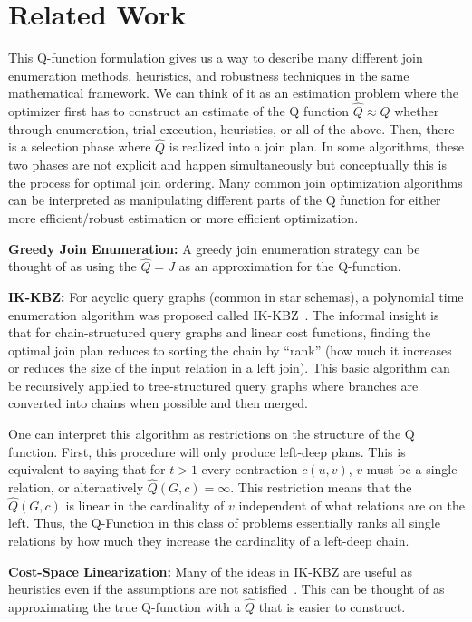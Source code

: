 \section{Related Work}
This Q-function formulation gives us a way to describe many different join enumeration methods, heuristics, and robustness techniques in the same mathematical framework. We can think of it as an estimation problem where the optimizer first has to construct an estimate of the Q function $\hat{Q} \approx Q$ whether through enumeration, trial execution, heuristics, or all of the above. Then, there is a selection phase where $\hat{Q}$ is realized into a join plan. In some algorithms, these two phases are not explicit and happen simultaneously but conceptually this is the process for optimal join ordering. Many common join optimization algorithms can be interpreted as manipulating different parts of the Q function for either more efficient/robust estimation or more efficient optimization.

\vspace{0.25em} \noindent \textbf{Greedy Join Enumeration: } A greedy join enumeration strategy can be thought of as using the $\hat{Q} = J$ as an approximation for the Q-function.

\vspace{0.25em} \noindent \textbf{IK-KBZ: } For acyclic query graphs (common in star schemas), a polynomial time enumeration algorithm was proposed called IK-KBZ~\cite{?}. The informal insight is that for chain-structured query graphs and linear cost functions, finding the optimal join plan reduces to sorting the chain by ``rank'' (how much it increases or reduces the size of the input relation in a left join). This basic algorithm can be recursively applied to tree-structured query graphs where branches are converted into chains when possible and then merged. 

One can interpret this algorithm as restrictions on the structure of the Q function. First, this procedure will only produce left-deep plans. This is equivalent to saying that for $t>1$ every contraction $c(u,v)$, $v$ must be a single relation, or alternatively $\hat{Q}(G,c) = \infty$. This restriction means that the $\hat{Q}(G,c)$ is linear in the cardinality of $v$ independent of what relations are on the left. Thus, the Q-Function in this class of problems essentially ranks all single relations by how much they increase the cardinality of a left-deep chain. 

\vspace{0.25em} \noindent \textbf{Cost-Space Linearization: } Many of the ideas in IK-KBZ are useful as heuristics even if the assumptions are not satisfied~\cite{?}. This can be thought of as approximating the true Q-function with a $\hat{Q}$ that is easier to construct.

